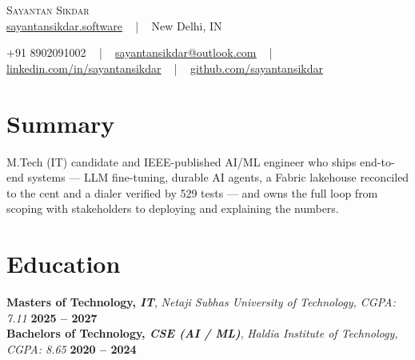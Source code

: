 \documentclass[letterpaper,11pt]{article}
\begin{document}
\begin{center}
    {\Huge \scshape Sayantan Sikdar} \\
    \vspace{2pt}
    \href{https://sayantansikdar.software}{\uline{sayantansikdar.software}} ~ | ~
    \small New Delhi, IN

    \vspace{4pt}
    \small +91 8902091002 ~ | ~ \href{mailto:sayantansikdar@outlook.com}{\uline{sayantansikdar@outlook.com}} ~ | ~
    \href{https://linkedin.com/in/sayantansikdar}{\uline{linkedin.com/in/sayantansikdar}} ~ | ~
    \href{https://github.com/sayantansikdar}{\uline{github.com/sayantansikdar}}
    \vspace{-8pt}
\end{center}

\section{Summary}
\begin{itemize}[leftmargin=0.15in, label={}]
    \small{\item{
     M.Tech (IT) candidate and IEEE-published AI/ML engineer who ships end-to-end systems --- LLM fine-tuning, durable AI
     agents, a Fabric lakehouse reconciled to the cent and a dialer verified by 529 tests --- and owns the full loop from
     scoping with stakeholders to deploying and explaining the numbers.
    }}
\end{itemize}
\vspace{-12pt}

\section{Education}
\begin{itemize}[leftmargin=0.15in, label={}]
    \small{\item{
     \textbf{Masters of Technology, \textit{IT}}, \textit{Netaji Subhas University of Technology, CGPA: 7.11} \hfill \textbf{2025 -- 2027} \\
     \textbf{Bachelors of Technology, \textit{CSE (AI / ML)}}, \textit{Haldia Institute of Technology, CGPA: 8.65} \hfill \textbf{2020 -- 2024}\\
    }}
\end{itemize}
\vspace{-12pt}

\end{document}
